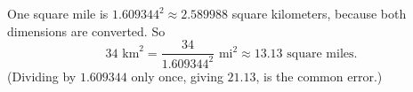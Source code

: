 One square mile is $1.609344^2\approx2.589988$ square kilometers, because both dimensions are converted. So
\[34\text{ km}^2=\dfrac{34}{1.609344^2}\text{ mi}^2\approx\boxed{13.13\text{ square miles}}.\]
(Dividing by $1.609344$ only once, giving $21.13$, is the common error.)
